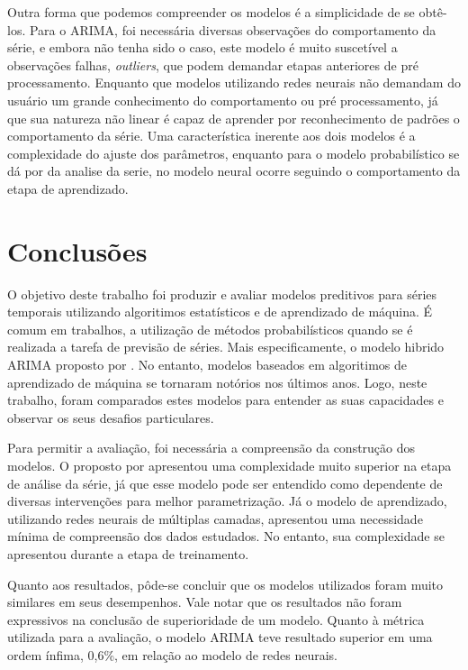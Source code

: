 \documentclass[
    12pt,
    oneside,
    a4paper,
    english,
    brazil
]{abntex2}
\begin{document}
Outra  forma  que  podemos  compreender  os modelos  é  a  simplicidade  de  se
obtê-los. Para o ARIMA, foi necessária diversas observações do comportamento da
série,  e embora  não tenha  sido  o caso,  este  modelo é  muito suscetível  a
observações falhas, \textit{outliers}, que  podem demandar etapas anteriores de
pré processamento. Enquanto  que modelos utilizando redes  neurais não demandam
do usuário um grande conhecimento do comportamento ou pré processamento, já que
sua natureza  não linear é  capaz de aprender  por reconhecimento de  padrões o
comportamento  da série.  Uma  característica  inerente aos  dois  modelos é  a
complexidade do ajuste dos parâmetros, enquanto para o modelo probabilístico se
dá por da analise da serie, no modelo neural ocorre seguindo o comportamento da
etapa de aprendizado.

\chapter{Conclusões}\label{chap:concl}

O objetivo deste trabalho foi produzir e avaliar modelos preditivos para séries
temporais utilizando  algoritimos estatísticos e  de aprendizado de  máquina. É
comum  em  trabalhos, a  utilização  de  métodos  probabilísticos quando  se  é
realizada  a tarefa  de  previsão  de séries.  Mais  especificamente, o  modelo
hibrido ARIMA  proposto por .  No entanto, modelos  baseados em
algoritimos de  aprendizado de máquina  se tornaram notórios nos  últimos anos.
Logo,  neste trabalho,  foram comparados  estes modelos  para entender  as suas
capacidades e observar os seus desafios particulares.

Para  permitir a  avaliação, foi  necessária  a compreensão  da construção  dos
modelos.  O proposto  por   apresentou  uma complexidade  muito
superior na etapa  de análise da série,  já que esse modelo  pode ser entendido
como  dependente  de  diversas  intervenções  para  melhor  parametrização.  Já
o  modelo  de  aprendizado,  utilizando redes  neurais  de  múltiplas  camadas,
apresentou  uma  necessidade mínima  de  compreensão  dos dados  estudados.  No
entanto, sua complexidade se apresentou durante a etapa de treinamento.

Quanto aos resultados,  pôde-se concluir que os modelos  utilizados foram muito
similares  em  seus  desempenhos.  Vale  notar  que  os  resultados  não  foram
expressivos  na conclusão  de  superioridade  de um  modelo.  Quanto à  métrica
utilizada para a avaliação, o modelo ARIMA teve resultado superior em uma ordem
ínfima, 0,6\%, em relação ao modelo de redes neurais.
\end{document}
